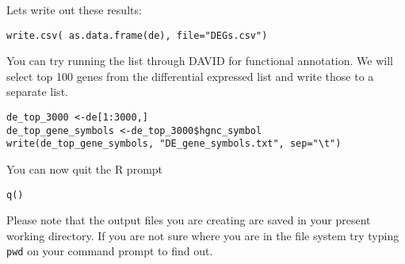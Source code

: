 \begin{steps}
Lets write out these results:
\begin{lstlisting}
write.csv( as.data.frame(de), file="DEGs.csv")
\end{lstlisting}
You can try running the list through DAVID for functional annotation.
We will select top 100 genes from the differential expressed list and write those to a separate list.

\begin{lstlisting}
de_top_3000 <-de[1:3000,]
de_top_gene_symbols <-de_top_3000$hgnc_symbol
write(de_top_gene_symbols, "DE_gene_symbols.txt", sep="\t")
\end{lstlisting}

You can now quit the R prompt
\begin{lstlisting}
q()
\end{lstlisting}
\end{steps}

\begin{note}
Please note that the output files you are creating are saved in your present working directory. If you are not sure where you are in the file system try typing \texttt{pwd} on your command prompt to find out.
\end{note}
\newpage

